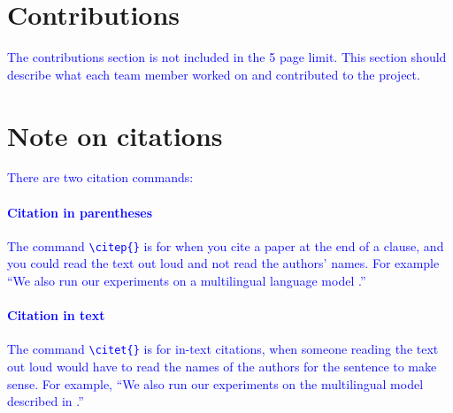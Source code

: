 \documentclass{article}
\newcommand{\note}[1]{\textcolor{blue}{{#1}}}
\begin{document}
\section{Contributions}
\note{%
The contributions section is not included in the 5 page limit. This section should describe what each team member worked on and contributed to the project.
}

\section{Note on citations}
\note{%
There are two citation commands:
}

\note{%
\paragraph{Citation in parentheses} The command \texttt{\textbackslash{}citep\{\}}  is for when you cite a paper at the end of a clause, and you could read the text out loud and not read the authors' names. For example ``We also run our experiments on a multilingual language model \citep{rajpurkar2018know}.'' 
}

\note{%
\paragraph{Citation in text} The command \texttt{\textbackslash{}citet\{\}} is for in-text citations, when someone reading the text out loud would have to read the names of the authors for the sentence to make sense. For example, ``We also run our experiments on the multilingual model described in \citet{rajpurkar2018know}.''
}



\end{document}
